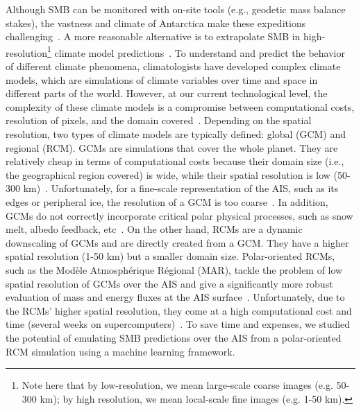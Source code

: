 \documentclass[a4paper,11pt,oneside]{report}
\begin{document}
    
Although SMB can be monitored with on-site tools (e.g., geodetic mass balance stakes), the vastness and climate of Antarctica make these expeditions challenging~\cite{Lenaerts2019}. A more reasonable alternative is to extrapolate SMB in high-resolution\footnote{Note here that by low-resolution, we mean large-scale coarse images (e.g. 50-300 \si{km}); by high resolution, we mean local-scale fine images (e.g. 1-50 \si{km}).} climate model predictions~\cite{Mottram}. To understand and predict the behavior of different climate phenomena, climatologists have developed complex climate models, which are simulations of climate variables over time and space in different parts of the world. However, at our current technological level, the complexity of these climate models is a compromise between computational costs, resolution of pixels, and the domain covered~\cite{Doury}. Depending on the spatial resolution, two types of climate models are typically defined: global (GCM) and regional (RCM). GCMs are simulations that cover the whole planet. They are relatively cheap in terms of computational costs because their domain size (i.e., the geographical region covered) is wide, while their spatial resolution is low (50-300 \si{km})~\cite{Doury}. Unfortunately, for a fine-scale representation of the AIS, such as its edges or peripheral ice, the resolution of a GCM is too coarse~\cite{Kittel, Seroussi}. In addition, GCMs do not correctly incorporate critical polar physical processes, such as snow melt, albedo feedback, etc~\cite{Kittel, Lenaerts2016}. On the other hand, RCMs are a dynamic downscaling of GCMs and are directly created from a GCM. They have a higher spatial resolution (1-50 \si{km}) but a smaller domain size. Polar-oriented RCMs, such as the Modèle Atmosphérique Régional (MAR), tackle the problem of low spatial resolution of GCMs over the AIS and give a significantly more robust evaluation of mass and energy fluxes at the AIS surface~\cite{Kittel, Fyke2018}. Unfortunately, due to the RCMs' higher spatial resolution, they come at a high computational cost and time (several weeks on supercomputers)~\cite{Doury}. To save time and expenses, we studied the potential of emulating SMB predictions over the AIS from a polar-oriented RCM simulation using a machine learning framework. 


    
\end{document}
